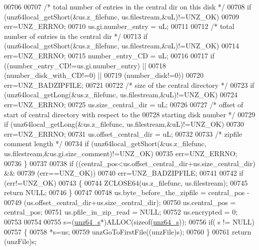 \begin{DoxyCode}
00706 
00707         \textcolor{comment}{/* total number of entries in the central dir on this disk */}
00708         \textcolor{keywordflow}{if} (unz64local\_getShort(&us.z\_filefunc, us.filestream,&uL)!=UNZ\_OK)
00709             err=UNZ\_ERRNO;
00710         us.gi.number\_entry = uL;
00711 
00712         \textcolor{comment}{/* total number of entries in the central dir */}
00713         \textcolor{keywordflow}{if} (unz64local\_getShort(&us.z\_filefunc, us.filestream,&uL)!=UNZ\_OK)
00714             err=UNZ\_ERRNO;
00715         number\_entry\_CD = uL;
00716 
00717         \textcolor{keywordflow}{if} ((number\_entry\_CD!=us.gi.number\_entry) ||
00718             (number\_disk\_with\_CD!=0) ||
00719             (number\_disk!=0))
00720             err=UNZ\_BADZIPFILE;
00721 
00722         \textcolor{comment}{/* size of the central directory */}
00723         \textcolor{keywordflow}{if} (unz64local\_getLong(&us.z\_filefunc, us.filestream,&uL)!=UNZ\_OK)
00724             err=UNZ\_ERRNO;
00725         us.size\_central\_dir = uL;
00726 
00727         \textcolor{comment}{/* offset of start of central directory with respect to the}
00728 \textcolor{comment}{            starting disk number */}
00729         \textcolor{keywordflow}{if} (unz64local\_getLong(&us.z\_filefunc, us.filestream,&uL)!=UNZ\_OK)
00730             err=UNZ\_ERRNO;
00731         us.offset\_central\_dir = uL;
00732 
00733         \textcolor{comment}{/* zipfile comment length */}
00734         \textcolor{keywordflow}{if} (unz64local\_getShort(&us.z\_filefunc, us.filestream,&us.gi.size\_comment)!=UNZ\_OK)
00735             err=UNZ\_ERRNO;
00736     \}
00737 
00738     \textcolor{keywordflow}{if} ((central\_pos<us.offset\_central\_dir+us.size\_central\_dir) &&
00739         (err==UNZ\_OK))
00740         err=UNZ\_BADZIPFILE;
00741 
00742     \textcolor{keywordflow}{if} (err!=UNZ\_OK)
00743     \{
00744         ZCLOSE64(us.z\_filefunc, us.filestream);
00745         \textcolor{keywordflow}{return} NULL;
00746     \}
00747 
00748     us.byte\_before\_the\_zipfile = central\_pos -
00749                             (us.offset\_central\_dir+us.size\_central\_dir);
00750     us.central\_pos = central\_pos;
00751     us.pfile\_in\_zip\_read = NULL;
00752     us.encrypted = 0;
00753 
00754 
00755     s=(\hyperlink{structunz64__s}{unz64\_s}*)ALLOC(\textcolor{keyword}{sizeof}(\hyperlink{structunz64__s}{unz64\_s}));
00756     \textcolor{keywordflow}{if}( s != NULL)
00757     \{
00758         *s=us;
00759         unzGoToFirstFile((unzFile)s);
00760     \}
00761     \textcolor{keywordflow}{return} (unzFile)s;

\end{DoxyCode}
